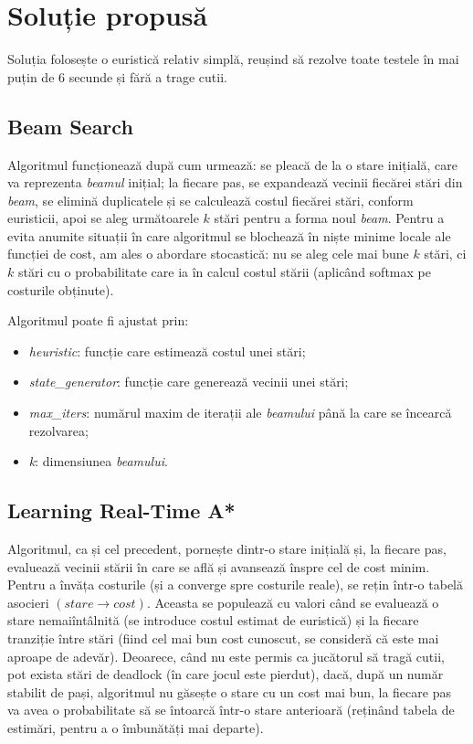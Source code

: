 \documentclass{article}
\begin{document}
\section{Soluție propusă}
Soluția folosește o euristică relativ simplă, reușind să rezolve toate testele
în mai puțin de 6 secunde și fără a trage cutii. 

\subsection{Beam Search}
Algoritmul funcționează după cum urmează: se pleacă de la o stare inițială,
care va reprezenta \textit{beamul} inițial; la fiecare pas, se expandează 
vecinii fiecărei stări din \textit{beam}, se elimină duplicatele și se 
calculează costul fiecărei stări, conform euristicii, apoi se aleg următoarele 
$k$ stări pentru a forma noul \textit{beam}. Pentru a evita anumite situații
în care algoritmul se blochează în niște minime locale ale funcției de cost, 
am ales o abordare stocastică: nu se aleg cele mai bune $k$ stări, ci $k$ stări 
cu o probabilitate care ia în calcul costul stării (aplicând softmax pe 
costurile obținute).

Algoritmul poate fi ajustat prin:
\begin{itemize}
    \item \textit{heuristic}: funcție care estimează costul unei stări;
    \item \textit{state\_generator}: funcție care generează vecinii unei stări;
    \item \textit{max\_iters}: numărul maxim de iterații ale \textit{beamului}
    până la care se încearcă rezolvarea;
    \item \textit{k}: dimensiunea \textit{beamului}.    
\end{itemize}

\subsection{Learning Real-Time A*}
Algoritmul, ca și cel precedent, pornește dintr-o stare inițială și, la fiecare
pas, evaluează vecinii stării în care se află și avansează înspre cel de cost 
minim. Pentru a învăța costurile (și a converge spre costurile reale), se rețin 
într-o tabelă asocieri $(stare \rightarrow cost)$. Aceasta se populează cu 
valori când se evaluează o stare nemaiîntâlnită (se introduce costul estimat de 
euristică) și la fiecare tranziție între stări (fiind cel mai bun cost cunoscut,
se consideră că este mai aproape de adevăr). Deoarece, când nu este permis ca
jucătorul să tragă cutii, pot exista stări de deadlock (în care jocul este 
pierdut), dacă, după un număr stabilit de pași, algoritmul nu găsește o stare cu
un cost mai bun, la fiecare pas va avea o probabilitate să se întoarcă într-o 
stare anterioară (reținând tabela de estimări, pentru a o îmbunătăți mai 
departe).
\end{document}
